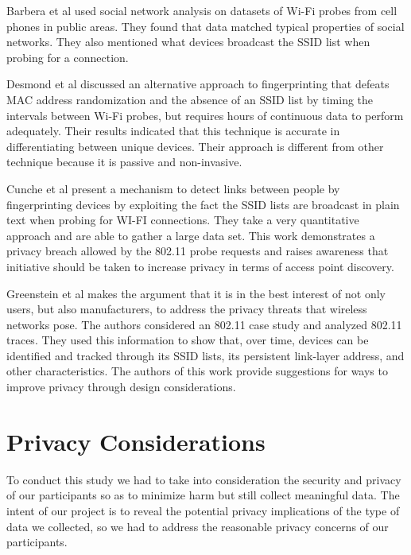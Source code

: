 \documentclass[letterpaper,twocolumn,10pt]{article}
\begin{document}
Barbera et al \cite{barbera} used social network analysis on datasets of Wi-Fi probes from cell phones in public areas. They found that data matched typical properties of social networks. They also mentioned what devices broadcast the SSID list when probing for a connection.

Desmond et al \cite{desmond} discussed an alternative approach to fingerprinting that defeats MAC address randomization and the absence of an SSID list by timing the intervals between Wi-Fi probes, but requires hours of continuous data to perform adequately. Their results indicated that this technique is accurate in differentiating between unique devices. Their approach is different from other technique because it is passive and non-invasive.

Cunche et al \cite{cunche}  present a mechanism to detect links between people by fingerprinting devices by exploiting the fact the SSID lists are broadcast in plain text when probing for WI-FI connections. They take a very quantitative approach and are able to gather a large data set. This work demonstrates a privacy breach allowed by the 802.11 probe requests and raises awareness that initiative should be taken to increase privacy in terms of access point discovery. 

Greenstein et al \cite{greenstein} makes the argument that it is in the best interest of not only users, but also manufacturers, to address the privacy threats that wireless networks pose. The authors considered an 802.11 case study and analyzed 802.11 traces. They used this information to show that, over time, devices can be identified and tracked through its SSID lists, its persistent link-layer address, and other characteristics. The authors of this work provide suggestions for ways to improve privacy through design considerations.

\section{Privacy Considerations}
To conduct this study we had to take into consideration the security and privacy of our participants so as to minimize harm but still collect meaningful data. The intent of our project is to reveal the potential privacy implications of the type of data we collected, so we had to address the reasonable privacy concerns of our participants.
\end{document}
